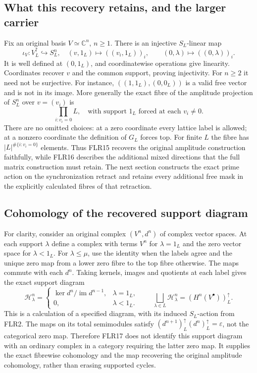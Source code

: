 \documentclass[11pt]{article}
\begin{document}
\subsection{What this recovery retains, and the larger carrier}
Fix an original basis $V\simeq\mathbb C^n$, $n\ge1$. There is an injective
$S_L$-linear map
\[
\iota_{V}:V_L^\uparrow\hookrightarrow S_L^n,
\quad(v,1_L)\mapsto((v_i,1_L))_i,\qquad
(0,\lambda)\mapsto((0,\lambda))_i.
\tag{FLR15}
\]
It is well defined at $(0,1_L)$, and coordinatewise operations give
linearity. Coordinates recover $v$ and the common support, proving
injectivity. For $n\ge2$ it need not be surjective. For instance,
$((1,1_L),(0,0_L))$ is a valid free vector and is not in its image.
More generally the exact fibre of the amplitude projection of $S_L^n$
over $v=(v_i)$ is
\[
\prod_{i:v_i=0}L,
\quad\text{with support }1_L\text{ forced at each }v_i\ne0.
\tag{FLR16}
\]
There are no omitted choices: at a zero coordinate every lattice label
is allowed; at a nonzero coordinate the definition of $G_L$ forces top.
For finite $L$ the fibre has $|L|^{\#\{i:v_i=0\}}$ elements.
Thus FLR15 recovers the original amplitude construction faithfully,
while FLR16 describes the additional mixed directions that the full
matrix construction must retain. The next section constructs the exact
prime action on the synchronization retract and retains every additional
free mask in the explicitly calculated fibres of that retraction.

\subsection{Cohomology of the recovered support diagram}
For clarity, consider an original complex $(V^n,d^n)$ of complex vector
spaces. At each support $\lambda$ define a complex with terms
$V^n$ for $\lambda=1_L$ and the zero vector space for $\lambda<1_L$.
For $\lambda\le\mu$, use the identity when the labels agree and the
unique zero map from a lower zero fibre to the top fibre otherwise.
The maps commute with each $d^n$. Taking kernels, images and quotients
at each label gives the exact support diagram
\[
\mathcal H^n_\lambda=
\begin{cases}
\ker d^n/\operatorname{im}d^{n-1},&\lambda=1_L,\\
0,&\lambda<1_L.
\end{cases}
\qquad
\bigsqcup_{\lambda\in L}\mathcal H^n_\lambda
 =(H^n(V^\bullet))_L^\uparrow.
\tag{FLR17}
\]
This is a calculation of a specified diagram, with its induced
$S_L$-action from FLR2. The maps on its total semimodules satisfy
$(d^{n+1})_L^\uparrow(d^n)_L^\uparrow=\varepsilon$, not the categorical
zero map. Therefore FLR17 does not identify this support diagram with
an ordinary complex in a category requiring the latter zero map.
It supplies the exact fibrewise cohomology and the map recovering the
original amplitude cohomology, rather than erasing supported cycles.
\end{document}
